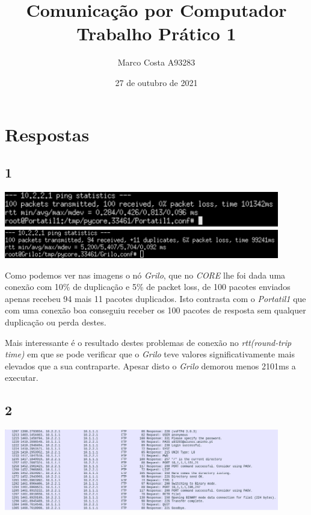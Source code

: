 \documentclass{article}
\title{
    Comunicação por Computador \\
    \large{Trabalho Prático 1}
}
\author{
    Marco Costa A93283
}
\date{27 de outubro de 2021}
\affil{
    Universidade do Minho
}
\begin{document}
    \begin{titlepage}
        \maketitle
    \end{titlepage}
    \section*{Respostas}
        \subsection*{1}
            {
                \centering
                \includegraphics[width=12cm]{images/ping-portatil.png}
                \includegraphics[width=12cm]{images/ping-grilo.png}
                \par
            }
                Como podemos ver nas imagens o nó \textit{Grilo}, que no \textit{CORE} lhe foi dada
            uma conexão com 10\% de duplicação e 5\% de packet loss, de 100 pacotes enviados apenas recebeu
            94 mais 11 pacotes duplicados. Isto contrasta com o \textit{Portatil1} que com uma conexão boa conseguiu
            receber os 100 pacotes de resposta sem qualquer duplicação ou perda destes.\par

                Mais interessante é o resultado destes problemas de conexão no \textit{rtt(round-trip time)} em que se pode verificar
            que o \textit{Grilo} teve valores significativamente mais elevados que a sua contraparte. Apesar disto o \textit{Grilo} demorou
            menos 2101ms a executar.
        \subsection*{2}
            {
                \centering
                \includegraphics[width=12cm]{images/ftp-wireshark.png}
                \par
            }
\end{document}
